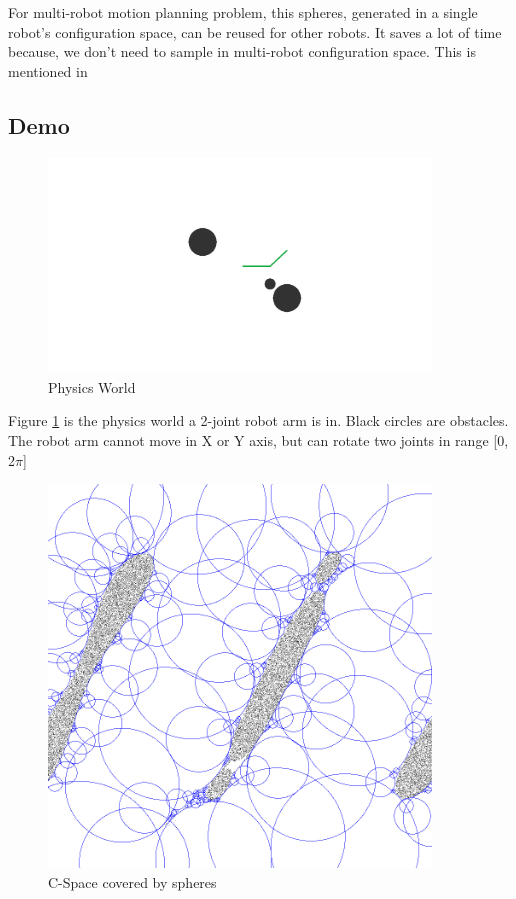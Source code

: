 \documentclass{article}
\begin{document}
      For multi-robot motion planning problem, this spheres, generated in a single robot's configuration space, can be reused for other robots. It saves a lot of time because, we don't need to sample in multi-robot configuration space. This is mentioned in \cite{Bialkowski2013} 

  \subsection{Demo}
    \begin{figure}
      \centering
      \includegraphics[width=4in]{PhysicSpace_Origin.PNG}
      \caption{Physics World}
      \label{fig:PhysicsWorld}
    \end{figure}

    Figure \ref{fig:PhysicsWorld} is the physics world a 2-joint robot arm is in. Black circles are obstacles. The robot arm cannot move in X or Y axis, but can rotate two joints in range [0, 2$\pi$]

    \begin{figure}
      \centering
      \includegraphics[width=4in]{CSpace.PNG}
      \caption{C-Space covered by spheres}
      \label{fig:C-Space}
    \end{figure}
\end{document}
